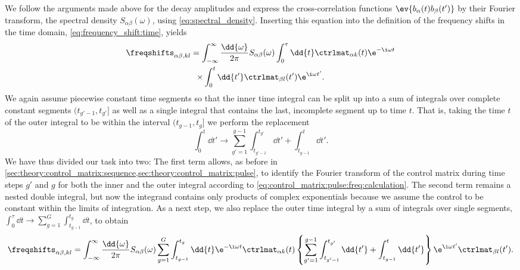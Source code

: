We follow the arguments made above for the decay amplitudes and express the cross-correlation functions $\ev{b_\alpha(t) b_\beta(t')}$ by their Fourier transform, the spectral density $S_{\alpha\beta}(\omega)$, using \cref{eq:spectral_density}. Inserting this equation into the definition of the frequency shifts in the time domain, \cref{eq:frequency_shift:time}, yields
\begin{multline}\label{eq:frequency_shifts:time}
    \freqshifts_{\alpha\beta,kl} = \int_{-\infty}^\infty\frac{\dd{\omega}}{2\pi} S_{\alpha\beta}(\omega)
                                   \int_0^\tau\dd{t}\ctrlmat_{\alpha k}(t)\e^{-\i\omega t} \\
                                   \times\int_0^t\dd{t'}\ctrlmat_{\beta l}(t')\e^{\i\omega t'}.
\end{multline}
We again assume piecewise constant time segments so that the inner time integral can be split up into a sum of integrals over complete constant segments $(t_{g'-1},t_{g'}]$ as well as a single integral that contains the last, incomplete segment up to time $t$. That is, taking the time $t$ of the outer integral to be within the interval $(t_{g-1}, t_g]$ we perform the replacement
\begin{equation}
    \int_0^t\dd{t'} \rightarrow \sum_{g'=1}^{g-1}\int_{t_{g'-1}}^{t_{g'}}\dd{t'} + \int_{t_{g-1}}^{t}\dd{t'}.
\end{equation}
We have thus divided our task into two: The first term allows, as before in \cref{sec:theory:control_matrix:sequence,sec:theory:control_matrix:pulse}, to identify the Fourier transform of the control matrix during time steps $g'$ and $g$ for both the inner and the outer integral according to \cref{eq:control_matrix:pulse:freq:calculation}. The second term remains a nested double integral, but now the integrand contains only products of complex exponentials because we assume the control to be constant within the limits of integration. As a next step, we also replace the outer time integral by a sum of integrals over single segments, $\int_0^\tau\dd{t}\rightarrow\sum_{g=1}^G\int_{t_{g-1}}^{t_g}\dd{t}$, to obtain
\begin{equation}\label{eq:frequency_shifts:time:substituted}
    \freqshifts_{\alpha\beta,kl} = \int_{-\infty}^\infty\frac{\dd{\omega}}{2\pi} S_{\alpha\beta}(\omega)
            \sum_{g=1}^{G}\int_{t_{g-1}}^{t_{g}}\dd{t}\e^{-\i\omega t}\ctrlmat_{\alpha k}(t)
            \left\lbrace\sum_{g'=1}^{g-1}\int_{t_{g'-1}}^{t_{g'}}\dd{t'} + \int_{t_{g-1}}^{t}\dd{t'}\right\rbrace
            \e^{\i\omega t'}\ctrlmat_{\beta l}(t').
\end{equation}
